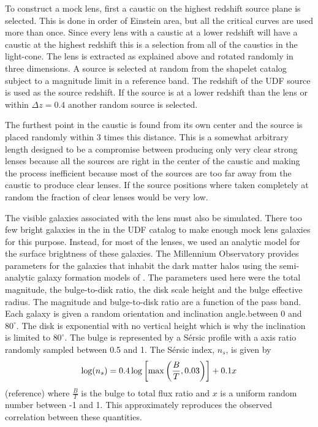 \documentclass[useAMS,usenatbib]{mnras}
\newcommand{\red}[1]{{\color{red} #1}}
\newcommand{\degree}{^{\circ}}
\begin{document}
To construct a mock lens, first a caustic on the highest redshift source plane is selected.  This is done in order of Einstein area, but all the critical curves are used more than once.  Since every lens with a caustic at a lower redshift will have a caustic at the highest redshift this is a selection from all of the caustics in the light-cone.   The lens is extracted as explained above and rotated randomly in three dimensions.  A source is selected at random from the shapelet catalog subject to a magnitude limit in a reference band.   The redshift of the UDF source is used as the source redshift.  If the source is at a lower redshift than the lens or within $\Delta z = 0.4$ another random source is selected.

The furthest point in the caustic is found from its own center and the source is placed randomly within 3 times this distance.  This is a somewhat arbitrary length designed to be a compromise between producing only very clear strong lenses because all the sources are right in the center of the caustic and making the process  inefficient because most of the sources are too far away from the caustic to produce clear lenses.  If the source positions where taken completely at random the fraction of clear lenses would be very low.

The visible galaxies associated with the lens must also be simulated. There  too few bright galaxies in the  in the UDF catalog to make enough mock lens galaxies for this purpose.  Instead, for most of the lenses, we used an analytic model for the surface brightness of these galaxies.  The Millennium Observatory provides parameters for the galaxies that inhabit the dark matter halos using the semi-analytic galaxy formation models of \citet{2011MNRAS.413..101G}.  The parameters used here were the total magnitude, the bulge-to-disk ratio, the disk scale height and the bulge effective radius.  The magnitude and bulge-to-disk ratio are a function of the pass band.  Each galaxy is given a random orientation and inclination angle.between 0 and $80\degree$.  The disk is exponential with no vertical height which is why the inclination is limited to $80\degree$.  The bulge is represented by a S\'{e}rsic profile with a axis ratio randomly sampled between 0.5 and 1.  The S\'{e}rsic index, $n_s$, is given by 
\begin{align}
\log( n_s )= 0.4 \log\left[ {\rm max}\left(\frac{B}{T},0.03\right)\right] + 0.1 x 
\end{align}
\red{(reference)} where $\frac{B}{T}$ is the bulge to total flux ratio and $x$ is a uniform random number between -1 and 1.  This approximately reproduces the observed correlation between these quantities. 
\end{document}

